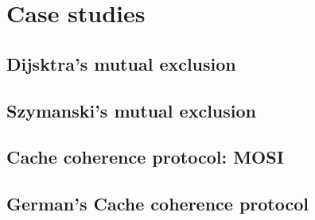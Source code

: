 % 
%
%
\newpage
\section{Case studies}
\label{appendix:experiments}
%
%
%

\subsection{Dijsktra's mutual exclusion}


\subsection{Szymanski's mutual exclusion}
%



\subsection{Cache coherence protocol: MOSI}

%

\subsection{German's Cache coherence protocol}


% 

